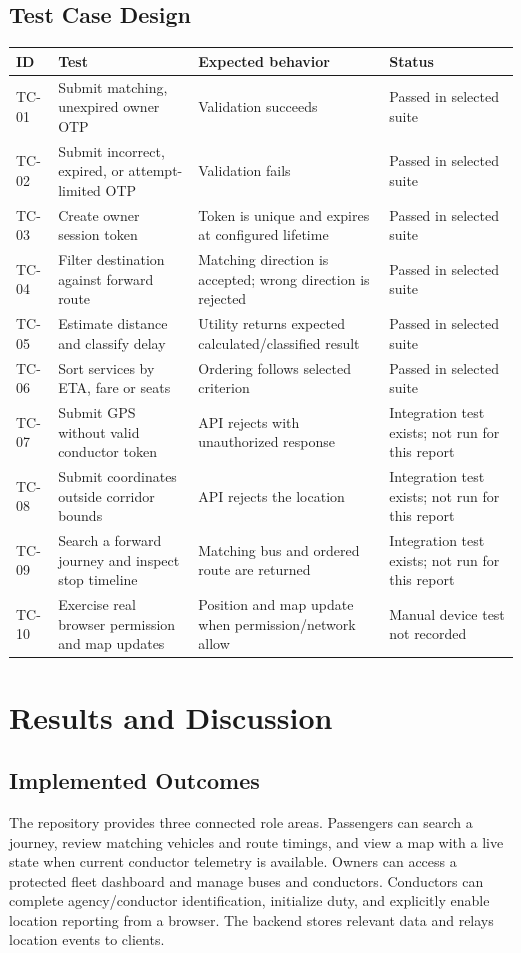 \documentclass[12pt,a4paper]{report}
\begin{document}
\section{Test Case Design}
\begin{longtable}{>{\RaggedRight\arraybackslash}p{}>{\RaggedRight\arraybackslash}p{}>{\RaggedRight\arraybackslash}p{}>{\RaggedRight\arraybackslash}p{}}
\toprule\textbf{ID}&\textbf{Test}&\textbf{Expected behavior}&\textbf{Status}\\\midrule
TC-01&Submit matching, unexpired owner OTP&Validation succeeds&Passed in selected suite\\
TC-02&Submit incorrect, expired, or attempt-limited OTP&Validation fails&Passed in selected suite\\
TC-03&Create owner session token&Token is unique and expires at configured lifetime&Passed in selected suite\\
TC-04&Filter destination against forward route&Matching direction is accepted; wrong direction is rejected&Passed in selected suite\\
TC-05&Estimate distance and classify delay&Utility returns expected calculated/classified result&Passed in selected suite\\
TC-06&Sort services by ETA, fare or seats&Ordering follows selected criterion&Passed in selected suite\\
TC-07&Submit GPS without valid conductor token&API rejects with unauthorized response&Integration test exists; not run for this report\\
TC-08&Submit coordinates outside corridor bounds&API rejects the location&Integration test exists; not run for this report\\
TC-09&Search a forward journey and inspect stop timeline&Matching bus and ordered route are returned&Integration test exists; not run for this report\\
TC-10&Exercise real browser permission and map updates&Position and map update when permission/network allow&Manual device test not recorded\\
\bottomrule
\end{longtable}

\chapter{Results and Discussion}
\section{Implemented Outcomes}
The repository provides three connected role areas. Passengers can search a journey, review matching vehicles and route timings, and view a map with a live state when current conductor telemetry is available. Owners can access a protected fleet dashboard and manage buses and conductors. Conductors can complete agency/conductor identification, initialize duty, and explicitly enable location reporting from a browser. The backend stores relevant data and relays location events to clients.
\end{document}
